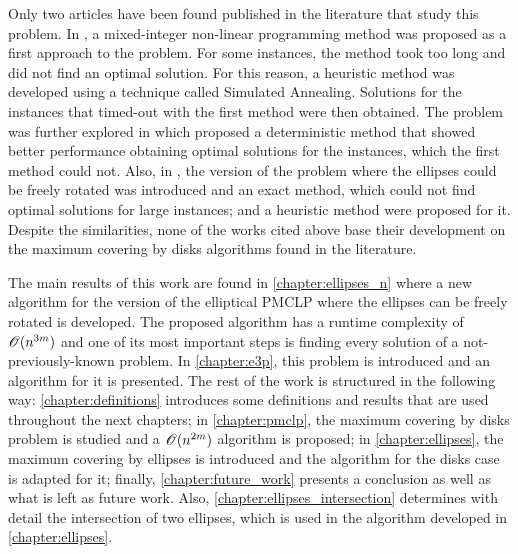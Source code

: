 Only two articles have been found published in the literature that study this problem. In , a mixed-integer non-linear programming method was proposed as a first approach to the problem. For some instances, the method took too long and did not find an optimal solution. For this reason, a heuristic method was developed using a technique called Simulated Annealing. Solutions for the instances that timed-out with the first method were then obtained. The problem was further explored in  which proposed a deterministic method that showed better performance obtaining optimal solutions for the instances, which the first method could not. Also, in , the version of the problem where the ellipses could be freely rotated was introduced and an exact method, which could not find optimal solutions for large instances; and a heuristic method were proposed for it. Despite the similarities, none of the works cited above base their development on the maximum covering by disks algorithms found in the literature.

The main results of this work are found in \autoref{chapter:ellipses_n} where a new algorithm for the version of the elliptical PMCLP where the ellipses can be freely rotated is developed. The proposed algorithm has a runtime complexity of $\mathscr{O}(n^{3m})$ and one of its most important steps is finding every solution of a not-previously-known problem. In \autoref{chapter:e3p}, this problem is introduced and an algorithm for it is presented. The rest of the work is structured in the following way: \autoref{chapter:definitions} introduces some definitions and results that are used throughout the next chapters; in \autoref{chapter:pmclp}, the maximum covering by disks problem is studied and a $\mathscr{O}(n^{2m})$ algorithm is proposed; in \autoref{chapter:ellipses}, the maximum covering by ellipses is introduced and the algorithm for the disks case is adapted for it; finally, \autoref{chapter:future_work} presents a conclusion as well as what is left as future work. Also, \autoref{chapter:ellipses_intersection} determines with detail the intersection of two ellipses, which is used in the algorithm developed in \autoref{chapter:ellipses}.

